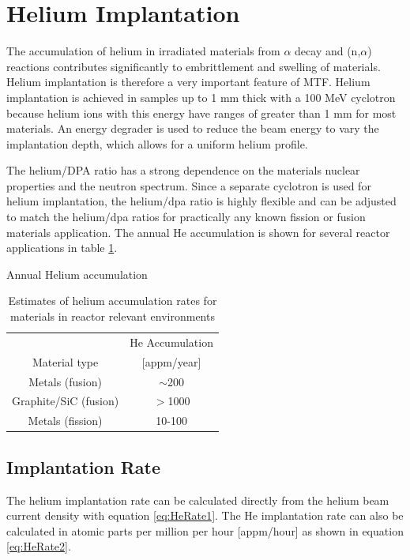 \documentclass[final,3p,times,twocolumn]{elsarticle} %
\begin{document}
\section{Helium Implantation}

The accumulation of helium in irradiated materials from $\alpha$ decay and (n,$\alpha$) reactions contributes significantly to embrittlement and swelling of materials.  Helium implantation is therefore a very important feature of MTF.  Helium implantation is achieved in samples up to 1 mm thick with a 100 MeV cyclotron because helium ions with this energy have ranges of greater than 1 mm for most materials.  An energy degrader is used to reduce the beam energy to vary the implantation depth, which allows for a uniform helium profile.

The helium/DPA ratio has a strong dependence on the materials nuclear properties and the neutron spectrum.  Since a separate cyclotron is used for helium implantation, the helium/dpa ratio is highly flexible and can be adjusted to match the helium/dpa ratios for practically any known fission or fusion materials application.  The annual He accumulation is shown for several reactor applications in table \ref{tab:AnnualHe}.

\begin{table}
\begin{center}
\caption{Annual Helium accumulation}
 \begin{tabular}{|c|c|}
  \hline
 & He Accumulation \\ 
    Material type & [appm/year] \\ \hline
   Metals (fusion)   	& $\sim$200               	\\
   Graphite/SiC (fusion) & $>$1000                 	\\
   Metals (fission)  	& 10-100                  	\\
  \hline
 \end{tabular}
\caption{Estimates of helium accumulation rates for materials in reactor relevant environments \cite{huh}} 
\label{tab:AnnualHe}
\end{center}
\end{table}

\subsection{Implantation Rate}
The helium implantation rate can be calculated directly from the helium beam current density with equation \ref{eq:HeRate1}.  The He implantation rate can also be calculated in atomic parts per million per hour [appm/hour] as shown in equation \ref{eq:HeRate2}.
\end{document}
